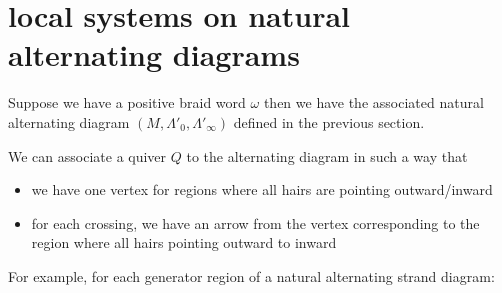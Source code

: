 \section{local systems on natural alternating diagrams}

Suppose we have a positive braid word $\omega$ then we have the associated natural alternating diagram $(M, \Lambda'_0, \Lambda'_\infty)$ defined in the previous section.

We can associate a quiver $Q$ to the alternating diagram in such a way that

\begin{itemize}
\item we have one vertex for regions where all hairs are pointing outward/inward
\item for each crossing, we have an arrow from the vertex corresponding to the region where all hairs pointing outward to inward
\end{itemize}

For example, for each generator region of a natural alternating strand diagram:

